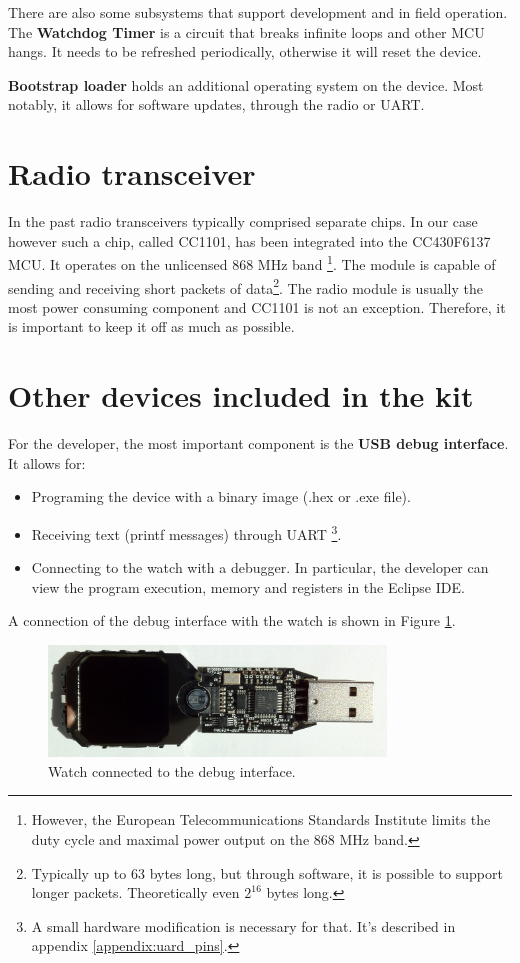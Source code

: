 There are also some subsystems that support development and in field
operation. The {\bf Watchdog Timer} is a circuit that breaks infinite
loops and other MCU hangs. It needs to be refreshed periodically,
otherwise it will reset the device.

{\bf Bootstrap loader} holds an additional operating system on the
device.  Most notably, it allows for software updates, through the
radio or UART.

\section{Radio transceiver}

In the past radio transceivers typically comprised separate chips. In
our case however such a chip, called CC1101, has been integrated into
the CC430F6137 MCU.  It operates on the unlicensed 868 MHz band
\footnote{However, the European Telecommunications Standards Institute
limits the duty cycle and maximal power output on the 868 MHz band.}.
The module is capable of sending and receiving short packets of
data\footnote{Typically up to 63 bytes long, but through software, it
is possible to support longer packets. Theoretically even $2^{16}$
bytes long.}.  The radio module is usually the most power consuming
component and CC1101 is not an exception. Therefore, it is important
to keep it off as much as possible.

\section{Other devices included in the kit}

For the developer, the most important component is the {\bf USB debug
interface}. It allows for:
\begin{itemize}
  \item Programing the device with a binary image (.hex or .exe file).
  \item Receiving text (printf messages) through UART \footnote{A small
    hardware modification is necessary for that. It's described in
    appendix \ref{appendix:uard_pins}.}.
  \item Connecting to the watch with a debugger. In particular, the
    developer can view the program execution, memory and registers in
    the Eclipse IDE.
\end{itemize}
A connection of the debug interface with the watch is shown in Figure
\ref{fig:chronos_dongle}.

\begin{figure}[h]
  \centering
  \includegraphics[width=0.8\textwidth]{img/chronos_dongle.jpg}
  \caption{Watch connected to the debug interface.}
  \label{fig:chronos_dongle}
\end{figure}

